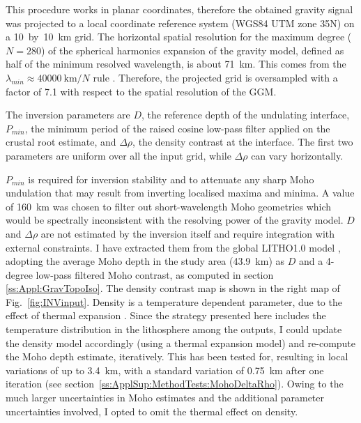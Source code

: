 This procedure works in planar coordinates, therefore the obtained gravity signal was projected to a local coordinate reference system (WGS84 UTM zone 35N) on a 10~by~10~{km} grid.
The horizontal spatial resolution for the maximum degree ($N=280$) of the spherical harmonics expansion of the gravity model, defined as half of the minimum resolved wavelength, is about 71~\si{\kilo \metre}. This comes from the $\lambda_{min} \approx 40000~\textrm{km} / N $ rule \parencite{HofmannWellenhof2006}.
Therefore, the projected grid is oversampled with a factor of 7.1 with respect to the spatial resolution of the GGM.

The inversion parameters are $D$, the reference depth of the undulating interface, $P_{min}$, the minimum period of the raised cosine low-pass filter applied on the crustal root estimate, and $\Delta \rho$, the density contrast at the interface.
The first two parameters are uniform over all the input grid, while $\Delta \rho$ can vary horizontally.

$P_{min}$ is required for inversion stability and to attenuate any sharp Moho undulation that may result from inverting localised maxima and minima.
A value of 160~{km} was chosen to filter out short-wavelength Moho geometries which would be spectrally inconsistent with the resolving power of the gravity model.
$D$ and $\Delta \rho$ are not estimated by the inversion itself and require integration with external constraints.
I have extracted them from the global {LITHO1.0} model \parencite{Pasyanos2014}, adopting the average Moho depth in the study area (43.9~\si{\kilo \metre}) as $D$ and a 4-degree low-pass filtered Moho contrast, as computed in section \ref{ss:Appl:GravTopoIso}.
The density contrast map is shown in the right map of Fig.~\ref{fig:INVinput}.
Density is a temperature dependent parameter, due to the effect of thermal expansion \parencite{allen2013basin}.
Since the strategy presented here includes the temperature distribution in the lithosphere among the outputs, I could update the density model accordingly (using a thermal expansion model) and re-compute the Moho depth estimate, iteratively.
This has been tested for, resulting in local variations of up to \SI{3.4}{\kilo \metre}, with a standard variation of \SI{0.75}{\kilo \metre} after one iteration (see section~\ref{ss:ApplSup:MethodTests:MohoDeltaRho}).
Owing to the much larger uncertainties in Moho estimates \parencite[\textpm~5 to \textpm~15 percent, see ][]{Grad2009} and the additional parameter uncertainties involved, I opted to omit the thermal effect on density.

